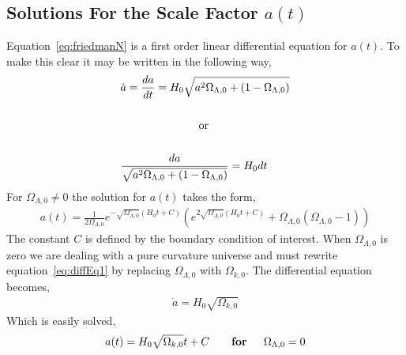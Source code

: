\documentclass[twoside]{article}
\begin{document}
\subsection{Solutions For the Scale Factor $a(t)$}

Equation~\ref{eq:friedmanN} is a first order linear differential equation for $a(t)$. To make this clear it may be written in the following way,
\begin{align}
&\dot{a} = \frac{da}{dt}=H_{0}\sqrt{a^{2}\Omega_{\Lambda,0}+(1-\Omega_{\Lambda,0})}\label{eq:diffEq1}\\\notag\\
&\hspace{2.5cm}\text{or} \notag\\\notag\\
&\frac{da}{\sqrt{a^{2}\Omega_{\Lambda,0}+(1-\Omega_{\Lambda,0})}}=H_{0}dt\label{eq:diffEq}
\end{align}
For $\Omega_{\Lambda,0}\neq 0$ the solution for $a(t)$ takes the form,
\begin{align}
a(t) = \frac{1}{2\Omega_{\Lambda,0}} e^{-\sqrt{\Omega_{\Lambda,0}}(H_{0}t+C)}\left(e^{2\sqrt{\Omega_{\Lambda,0}}(H_{0}t+C)}+\Omega_{\Lambda,0}(\Omega_{\Lambda,0}-1)\right)\label{eq:aOfT}
\end{align}
The constant $C$ is defined by the boundary condition of interest. When $\Omega_{\Lambda,0}$ is zero we are dealing with a pure curvature universe and must rewrite equation~\ref{eq:diffEq1} by replacing $\Omega_{\Lambda,0}$ with  $\Omega_{k,0}$. The differential equation becomes,
\begin{align}
\dot{a} = H_{0}\sqrt{\Omega_{k,0}}
\end{align}
Which is easily solved,
\begin{align}
a(t) = H_{0}\sqrt{\Omega_{k,0}}t+C \qquad\text{\textbf{for \quad $\Omega_{\Lambda,0}=0$}}\label{eq:pureK}
\end{align}
\end{document}
